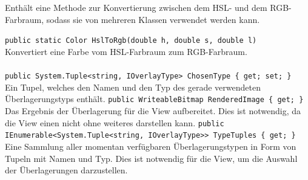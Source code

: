 \paragraph{}~\\
Enthält eine Methode zur Konvertierung zwischen dem HSL- und dem RGB-Farbraum, sodass sie von mehreren Klassen verwendet werden kann.
\begin{itemize}
	\add \verb!public static Color HslToRgb(double h, double s, double l)! \\
	Konvertiert eine Farbe vom HSL-Farbraum zum RGB-Farbraum.
\end{itemize}

\paragraph{}
\begin{itemize}
	\add \verb!public System.Tuple<string, IOverlayType> ChosenType { get; set; }! \\
	Ein Tupel, welches den Namen und den Typ des gerade verwendeten Überlagerungstyps enthält.
	\add \verb!public WriteableBitmap RenderedImage { get; }! \\
	Das Ergebnis der Überlagerung für die View aufbereitet. Dies ist notwendig, da die View einen  nicht ohne weiteres darstellen kann.
	\add \verb!public IEnumerable<System.Tuple<string, IOverlayType>> TypeTuples { get; }! \\
	Eine Sammlung aller momentan verfügbaren Überlagerungstypen in Form von Tupeln mit Namen und Typ. Dies ist notwendig für die View, um die Auswahl der Überlagerungen darzustellen.
\end{itemize}
\newpage

\subsection{}

